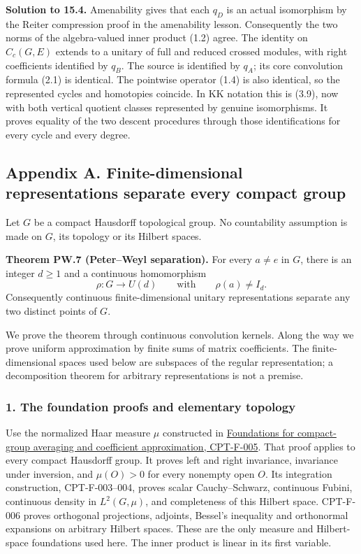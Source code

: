 \documentclass[
  11pt,
]{article}
\begin{document}
\textbf{Solution to 15.4.} Amenability gives that each \(q_D\) is an
actual isomorphism by the Reiter compression proof in the amenability
lesson. Consequently the two norms of the algebra-valued inner product
(1.2) agree. The identity on \(C_c(G,E)\) extends to a unitary of full
and reduced crossed modules, with right coefficients identified by
\(q_B\). The source is identified by \(q_A\); its core convolution
formula (2.1) is identical. The pointwise operator (1.4) is also
identical, so the represented cycles and homotopies coincide. In KK
notation this is (3.9), now with both vertical quotient classes
represented by genuine isomorphisms. It proves equality of the two
descent procedures through those identifications for every cycle and
every degree.

\subsection{Appendix A. Finite-dimensional representations separate
every compact
group}\label{appendix-a.-finite-dimensional-representations-separate-every-compact-group}

Let \(G\) be a compact Hausdorff topological group. No countability
assumption is made on \(G\), its topology or its Hilbert spaces.

\textbf{Theorem PW.7 (Peter--Weyl separation).} For every \(a\ne e\) in
\(G\), there is an integer \(d\geq1\) and a continuous homomorphism \[
\rho:G\longrightarrow U(d)
\qquad\text{with}\qquad \rho(a)\ne I_d.
\] Consequently continuous finite-dimensional unitary representations
separate any two distinct points of \(G\).

We prove the theorem through continuous convolution kernels. Along the
way we prove uniform approximation by finite sums of matrix
coefficients. The finite-dimensional spaces used below are subspaces of
the regular representation; a decomposition theorem for arbitrary
representations is not a premise.

\subsubsection{1. The foundation proofs and elementary
topology}\label{the-foundation-proofs-and-elementary-topology}

Use the normalized Haar measure \(\mu\) constructed in
\href{supporting/representations-of-compact-groups/compact-foundations.html\#cpt-f-005}{Foundations
for compact-group averaging and coefficient approximation, CPT-F-005}.
That proof applies to every compact Hausdorff group. It proves left and
right invariance, invariance under inversion, and \(\mu(O)>0\) for every
nonempty open \(O\). Its integration construction, CPT-F-003--004,
proves scalar Cauchy--Schwarz, continuous Fubini, continuous density in
\(L^2(G,\mu)\), and completeness of this Hilbert space. CPT-F-006 proves
orthogonal projections, adjoints, Bessel's inequality and orthonormal
expansions on arbitrary Hilbert spaces. These are the only measure and
Hilbert-space foundations used here. The inner product is linear in its
first variable.
\end{document}
